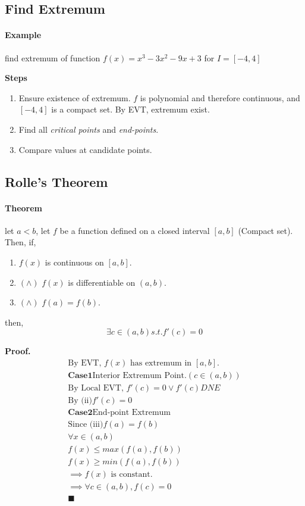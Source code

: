 \documentclass{article}
\begin{document}
	\subsection{Find Extremum}
	\paragraph{Example} find extremum of function $f(x) = x^3 - 3x^2 - 9x + 3$ for $I = [-4, 4]$

	\textbf{Steps}
	\begin{enumerate}
		\item Ensure existence of extremum. $f$ is polynomial and therefore continuous, and $[-4, 4]$ is a compact set. By EVT, extremum exist.
		\item Find all \emph{critical points} and \emph{end-points}.
		\item Compare values at candidate points.
	\end{enumerate}
	\subsection{Rolle's Theorem}
	\paragraph{Theorem} let $a < b$, let $f$ be a function defined on a closed interval $[a, b]$ (Compact set). Then, if, 
	\begin{enumerate}
		\item $f(x)$ is continuous on $[a, b]$.
		\item $(\land)$ $f(x)$ is differentiable on $(a, b)$.
		\item $(\land)$ $f(a) = f(b)$.
	\end{enumerate}
	then, 
	\[
	\exists c \in (a,b) s.t. f'(c) = 0
	\]

	\textbf{Proof.}
	\begin{align*}
		\text{By EVT, $f(x)$ has extremum in } [a,b]. \\
		\textbf{Case1} \text{Interior Extremum Point}. (c \in (a,b)) \\
		\text{By Local EVT, } f'(c) = 0 \lor f'(c) DNE \\
		\text{By (ii)} f'(c) = 0 \\
		\textbf{Case2} \text{End-point Extremum} \\
		\text{Since (iii)} f(a) = f(b) \\
		\forall x \in (a,b) \\
		f(x) \leq max(f(a),f(b)) \\
		f(x) \geq min(f(a),f(b)) \\
		\implies f(x) \text{ is constant.} \\
		\implies \forall c \in (a,b), f(c) = 0 \\
		\blacksquare
	\end{align*}
\end{document}
